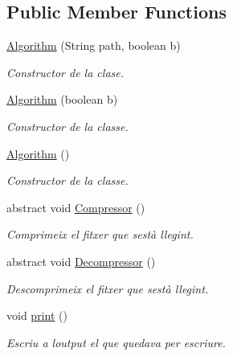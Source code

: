 \subsection*{Public Member Functions}
\begin{DoxyCompactItemize}
\item 
\hyperlink{classdomini_1_1algorithm_1_1Algorithm_a154c4e8cb723815bb8d8b5186ee93ec2}{Algorithm} (String path, boolean b)
\begin{DoxyCompactList}\small\item\em Constructor de la clase. \end{DoxyCompactList}\item 
\hyperlink{classdomini_1_1algorithm_1_1Algorithm_a53e4ed336c98702ebc2a44a5fdb5f4b5}{Algorithm} (boolean b)
\begin{DoxyCompactList}\small\item\em Constructor de la classe. \end{DoxyCompactList}\item 
\hyperlink{classdomini_1_1algorithm_1_1Algorithm_ad67a7c097eb86c4fc033f8deecb845a4}{Algorithm} ()
\begin{DoxyCompactList}\small\item\em Constructor de la classe. \end{DoxyCompactList}\item 
abstract void \hyperlink{classdomini_1_1algorithm_1_1Algorithm_afed9609e38c82431e0631fd84dbc89e4}{Compressor} ()
\begin{DoxyCompactList}\small\item\em Comprimeix el fitxer que s\textquotesingle{}està llegint. \end{DoxyCompactList}\item 
abstract void \hyperlink{classdomini_1_1algorithm_1_1Algorithm_ae712f08ef4b86cb625a9e00057ad8836}{Decompressor} ()
\begin{DoxyCompactList}\small\item\em Descomprimeix el fitxer que s\textquotesingle{}està llegint. \end{DoxyCompactList}\item 
void \hyperlink{classdomini_1_1algorithm_1_1Algorithm_a5546f991f9d71d012d6ded5f2d4181cb}{print} ()
\begin{DoxyCompactList}\small\item\em Escriu a l\textquotesingle{}output el que quedava per escriure. \end{DoxyCompactList}\end{DoxyCompactItemize}
